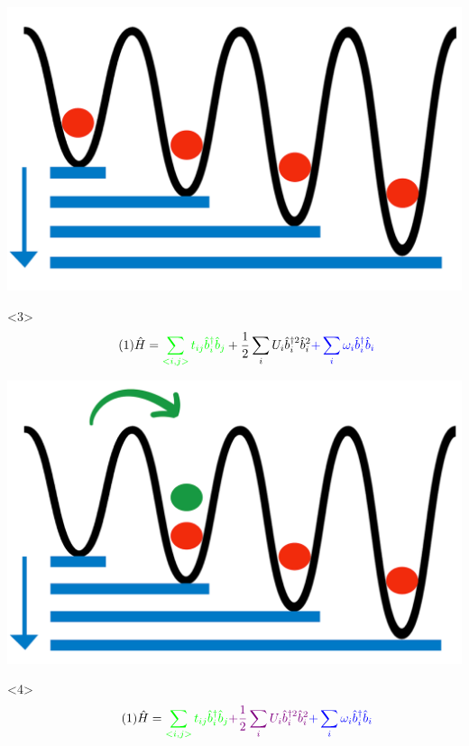 \documentclass[aspectratio=169]{beamer}
\begin{document}
\begin{frame}
\begin{onlyenv}
\begin{center}
    \includegraphics[scale=0.1]{../img/omega.png}
  \end{center}
\end{onlyenv}
\begin{onlyenv}<3>
  \begin{equation}\tag{1}
    \hat{H} = \textcolor{green}{\sum_{<i,j>} t_{ij}\hat{b}_i^\dagger \hat{b}_j} + \frac{1}{2}\sum_i U_i\hat{b}_i^{\dagger 2} \hat{b}_i^{2} \textcolor{blue}{+ \sum_i \omega_i \hat{b}_i^\dagger \hat{b}_i}
  \end{equation}
  \begin{center}
    \includegraphics[scale=0.1]{../img/t.png}
  \end{center}
\end{onlyenv}
\begin{onlyenv}<4>
  \begin{equation}\tag{1}
    \hat{H} = \textcolor{green}{\sum_{<i,j>} t_{ij}\hat{b}_i^\dagger \hat{b}_j} \textcolor{violet}{+ \frac{1}{2}\sum_i U_i\hat{b}_i^{\dagger 2} \hat{b}_i^{2}} \textcolor{blue}{+ \sum_i \omega_i \hat{b}_i^\dagger \hat{b}_i}

\end{equation}
\end{onlyenv}
\end{frame}
\end{document}
